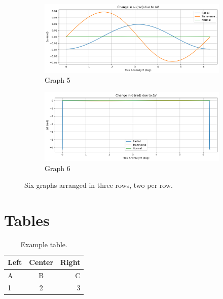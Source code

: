 \documentclass[a4paper, 12pt]{article}  %
\begin{document}
\begin{figure}[h]
        \begin{subfigure}[t]{0.45\textwidth}
            \centering
            \includegraphics[width=\linewidth]{del_lomega.png}
            \caption{Graph 5}
            \label{fig:graph5}
        \end{subfigure}
        \hspace{0.05\textwidth}
        \begin{subfigure}[t]{0.45\textwidth}
            \centering
            \includegraphics[width=\linewidth]{del_theta.png}
            \caption{Graph 6}
            \label{fig:graph6}
        \end{subfigure}
    
        \caption{Six graphs arranged in three rows, two per row.}
        \label{fig:six_graphs}
    \end{figure}


\section{Tables}
\begin{table}[H]
    \centering
    \begin{tabular}{l c r}
        \toprule
        Left & Center & Right \\
        \midrule
        A & B & C \\
        1 & 2 & 3 \\
        \bottomrule
    \end{tabular}
    \caption{Example table.}
    \label{tab:example}
\end{table}
\end{document}
